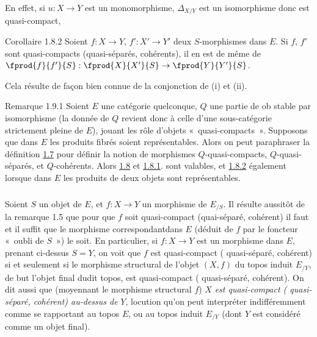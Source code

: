 En effet, si $u : X \to Y$ est un monomorphisme, $\Delta_{X/Y}$ est
un isomorphisme donc est quasi-compact, \cqfd

\begin{enonce*}{Corollaire 1.8.2}
Soient $f:X \to Y$, $f':X' \to Y'$ deux $S$-morphismes dans $E$. Si
$f$, $f'$ sont quasi-compacts (\resp quasi-séparés, \resp
cohérents), il en est de même de $\fprod{f}{f'}{S} : \fprod{X}{X'}{S} \to \fprod{Y}{Y'}{S}$.
\end{enonce*}

Cela résulte de façon bien connue de la conjonction de (i) et (ii).

\begin{enonce*}{Remarque 1.9.1}
Soient $E$ une catégorie quelconque, $Q$ une partie de ob stable par
isomorphisme (la donnée de $Q$ revient donc à celle d'une
sous-catégorie strictement pleine de $E$), jouant les rôle d'objets
« quasi-compacts ». Supposons que dans $E$ les produits fibrés
soient représentables. Alors on peut paraphraser la définition
\hyperref[VI.def1.7]{1.7} pour définir la notion de morphismes
$Q$-quasi-compacts, $Q$-quasi-séparés, et $Q$-cohérents. Alors
\hyperref[VI.prop1.8]{1.8} et \hyperref[VI.cor1.8.1]{1.8.1}. sont valables, et
\hyperref[VI.cor1.8.2]{1.8.2} également lorsque dans $E$ les produits de deux
objets sont représentables.
\end{enonce*}

\setcounter{subsection}{9}
\setcounter{subsubsection}{1}
\subsubsection{}
Soient $S$ un objet de $E$, et $f : X \to Y$ un morphisme de
$E_{/S}$. Il résulte aussitôt de la remarque 1.5 que pour que $f$
soit quasi-compact (\resp quai-séparé, \resp cohérent) il faut et il
suffit que le morphisme correspondant\pageoriginale dans $E$ (déduit
de $f$ par le foncteur « oubli de $S$ ») le soit. En
particulier, si $f : X \to Y$ est un morphisme dans $E$, prenant
ci-dessus $S=Y$, on voit que $f$ est quasi-compact (\resp
quasi-séparé, \resp cohérent) si et seulement si
 le morphisme structural de l'objet $(X, f)$ du topos induit
$E_{/Y}$, de but l'objet final dudit topos, est quasi-compact (\resp
quasi-séparé, \resp cohérent). On dit aussi que (moyennant le
morphisme structural $f$) $X$ \emph{est quasi-compact (\emph{\resp}
  quasi-séparé, \emph{\resp} cohérent) au-dessus de} $Y$, locution qu'on peut
interpréter indifféremment comme se rapportant au topos $E$, ou au
topos induit $E_{/Y}$ (dont $Y$ est considéré comme un objet final).

